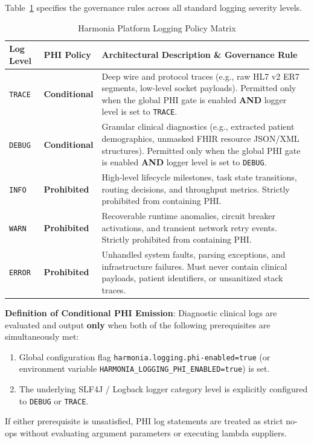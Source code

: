 Table~\ref{tab:phi_logging_policy_matrix} specifies the governance rules across all standard logging severity levels.

\begin{table}[htbp]
\centering
\small
\begin{tabularx}{\textwidth}{l l X}
\toprule
\textbf{Log Level} & \textbf{PHI Policy} & \textbf{Architectural Description \& Governance Rule} \\
\midrule
\texttt{TRACE} & \textbf{Conditional} & Deep wire and protocol traces (e.g., raw HL7 v2 ER7 segments, low-level socket payloads). Permitted only when the global PHI gate is enabled \textbf{AND} logger level is set to \texttt{TRACE}. \\
\addlinespace
\texttt{DEBUG} & \textbf{Conditional} & Granular clinical diagnostics (e.g., extracted patient demographics, unmasked FHIR resource JSON/XML structures). Permitted only when the global PHI gate is enabled \textbf{AND} logger level is set to \texttt{DEBUG}. \\
\addlinespace
\texttt{INFO}  & \textbf{Prohibited}  & High-level lifecycle milestones, task state transitions, routing decisions, and throughput metrics. Strictly prohibited from containing PHI. \\
\addlinespace
\texttt{WARN}  & \textbf{Prohibited}  & Recoverable runtime anomalies, circuit breaker activations, and transient network retry events. Strictly prohibited from containing PHI. \\
\addlinespace
\texttt{ERROR} & \textbf{Prohibited}  & Unhandled system faults, parsing exceptions, and infrastructure failures. Must never contain clinical payloads, patient identifiers, or unsanitized stack traces. \\
\bottomrule
\end{tabularx}
\caption{Harmonia Platform Logging Policy Matrix}
\label{tab:phi_logging_policy_matrix}
\end{table}

\begin{archinote}
\textbf{Definition of Conditional PHI Emission}: Diagnostic clinical logs are evaluated and output \textbf{only} when both of the following prerequisites are simultaneously met:
\begin{enumerate}
    \item Global configuration flag \texttt{harmonia.logging.phi-enabled=true} (or environment variable \texttt{HARMONIA\_LOGGING\_PHI\_ENABLED=true}) is set.
    \item The underlying SLF4J / Logback logger category level is explicitly configured to \texttt{DEBUG} or \texttt{TRACE}.
\end{enumerate}
If either prerequisite is unsatisfied, PHI log statements are treated as strict no-ops without evaluating argument parameters or executing lambda suppliers.
\end{archinote}

